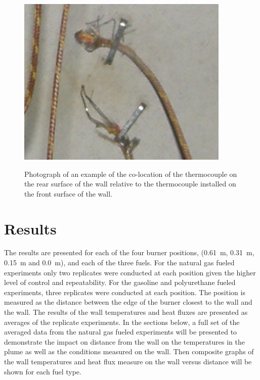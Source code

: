 \documentclass[twoside]{uocthesis}
\begin{document}
{\begin{figure}
	\centering
	\includegraphics[width=4.0in]{../Figures/Instrumented_Wall_Detail_Rear_TC_photo}\\
	\caption[Photograph of an example of the co-location of the thermocouple on the rear surface of the wall relative to the thermocouple installed on the front surface of the wall]{Photograph of an example of the co-location of the thermocouple on the rear surface of the wall relative to the thermocouple installed on the front surface of the wall.}
	\label{Instrumented_Wall_Detail_Rear_TC_photo}
\end{figure}


\section{Results}

The results are presented for each of the four burner positions, (0.61~m, 0.31~m, 0.15~m and 0.0~m), and each of the three fuels.  For the natural gas fueled experiments only two replicates were conducted at each position given the higher level of control and repeatability.  For the gasoline and polyurethane fueled experiments, three replicates were conducted at each position. The position is measured as the distance between the edge of the burner closest to the wall and the wall.  The results of the wall temperatures and heat fluxes are presented as averages of the replicate experiments.  In the sections below, a full set of the averaged data from the natural gas fueled experiments will be presented to demonstrate the impact on distance from the wall on the temperatures in the plume as well as the conditions measured on the wall. Then composite graphs of the wall temperatures and heat flux measure on the wall versus distance will be shown for each fuel type.

}
\end{document}

